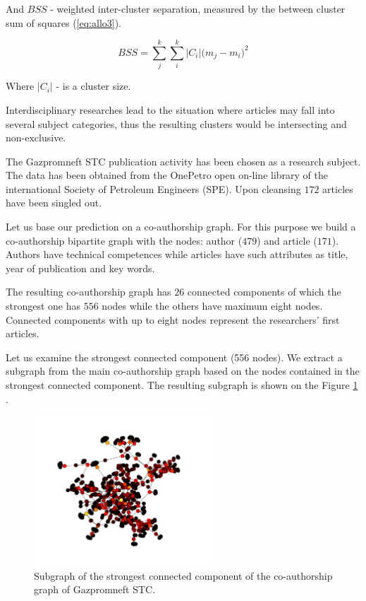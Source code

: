 \documentclass[12pt]{report}
\theoremstyle{definition}
\begin{document}
And $\mathit{BSS}$ - weighted inter-cluster separation, measured by the between cluster sum of squares (\ref{eq:allo3}).

\begin{equation} 
BSS = \displaystyle\sum_j^k\sum_i^k \vert C_i \vert \big(m_j - m_i\big)^2
\label{eq:allo3}
\end{equation}

Where $ \vert C_i \vert $ - is a cluster size.

Interdisciplinary researches lead to the situation where articles may fall into several subject categories, thus the resulting clusters would be intersecting and non-exclusive.

The Gazpromneft STC publication activity has been chosen as a research subject. 
The data has been obtained from the OnePetro open on-line library of the international Society of Petroleum Engineers (SPE). 
Upon cleansing $172$ articles have been singled out.

Let us base our prediction on a co-authorship graph. 
For this purpose we build a co-authorship bipartite graph \cite{krasnov2018bi} with the nodes: author ($479$) and article ($171$). Authors have technical competences while articles have such attributes as title, year of publication and key words.

The resulting co-authorship graph has $26$ connected components of which the strongest one has $556$ nodes while the others have maximum eight nodes. 
Connected components with up to eight nodes represent the researchers’ first articles. 

Let us examine the strongest connected component (556 nodes). We extract a subgraph from the main co-authorship graph based on the nodes contained in the strongest connected component. The resulting subgraph is shown on the Figure \ref{fig:allo3} .

\begin{figure}[ht]
	\centering
	\includegraphics[width=0.6\textwidth]{allo3eng.png}
	\caption{Subgraph of the strongest connected component of the co-authorship graph of Gazpromneft STC.}
	\label{fig:allo3}
\end{figure}
\end{document}
